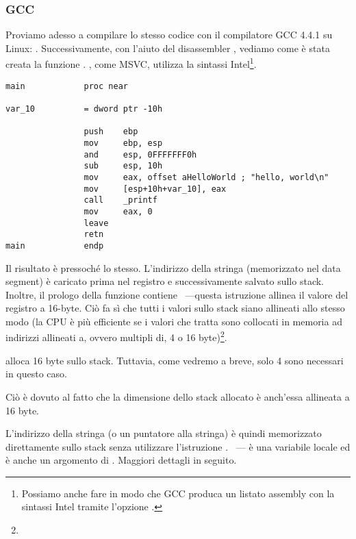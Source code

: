 \subsubsection{GCC}

Proviamo adesso a compilare lo stesso codice \CCpp con il compilatore GCC 4.4.1 su Linux: .
Successivamente, con l'aiuto del disassembler \IDA, vediamo come è stata creata la funzione \main .
\IDA, come MSVC, utilizza la sintassi Intel\footnote{Possiamo anche fare in modo che GCC produca un listato assembly con la sintassi Intel tramite l'opzione .}.

\begin{lstlisting}[caption=codice in \IDA,style=customasm]
main            proc near

var_10          = dword ptr -10h

                push    ebp
                mov     ebp, esp
                and     esp, 0FFFFFFF0h
                sub     esp, 10h
                mov     eax, offset aHelloWorld ; "hello, world\n"
                mov     [esp+10h+var_10], eax
                call    _printf
                mov     eax, 0
                leave
                retn
main            endp
\end{lstlisting}

Il risultato è pressoché lo stesso.
L'indirizzo della stringa  (memorizzato nel data segment) è caricato prima nel registro \EAX e successivamente salvato sullo stack.
Inoltre, il prologo della funzione contiene ~---questa 
istruzione allinea il valore del registro \ESP a 16-byte.
Ciò fa sì che tutti i valori sullo stack siano allineati allo stesso modo (la CPU è più efficiente se i valori che tratta sono collocati in memoria ad indirizzi allineati a, ovvero multipli di, 4 o 16 byte)\footnote{\URLWPDA}.

 alloca 16 byte sullo stack. Tuttavia, come vedremo a breve, solo 4 sono necessari in questo caso.

Ciò è dovuto al fatto che la dimensione dello stack allocato è anch'essa allineata a 16 byte.

L'indirizzo della stringa (o un puntatore alla stringa) è quindi memorizzato direttamente sullo stack senza utilizzare l'istruzione \PUSH .
~--- è una variabile locale ed è anche un argomento di \printf{}.
Maggiori dettagli in seguito.

